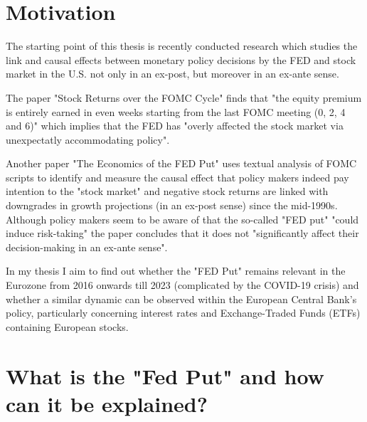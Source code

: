 
\chapter{Motivation}


The starting point of this thesis is recently conducted research which studies the link and causal effects between monetary policy decisions by the FED and stock market in the U.S.  not only in an ex-post,  but moreover in an ex-ante sense.

The paper "Stock Returns over the FOMC Cycle" \parencite{cieslak_stock_2019} finds that "the equity premium is entirely earned in even weeks starting from the last FOMC meeting (0,  2,  4 and 6)" which implies that the FED has "overly affected the stock market via unexpectatly accommodating policy". 

Another paper "The Economics of the FED Put"  \parencite{cieslak_economics_2021} uses textual analysis of FOMC scripts to identify and measure the causal effect that policy makers indeed pay intention to the "stock market" and negative stock returns are linked with downgrades in growth projections (in an ex-post sense) since the mid-1990s.  
Although policy makers seem to be aware of that the so-called "FED put" "could induce risk-taking" the paper concludes that it does not "significantly affect their decision-making in an ex-ante sense".

In my thesis I aim to find out whether the "FED Put" remains relevant in the Eurozone from 2016 onwards till 2023 (complicated by the COVID-19 crisis) and whether a similar dynamic can be observed within the European Central Bank's policy, particularly concerning interest rates and Exchange-Traded Funds (ETFs) containing European stocks. 



\chapter{What is the "Fed Put" and how can it be explained?}


